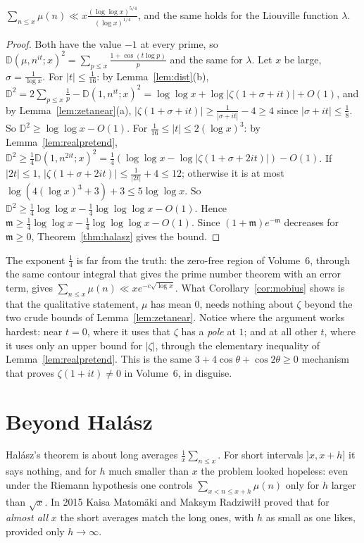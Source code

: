 \begin{corollary}\label{cor:mobius}
$\sum_{n\le x}\mu(n)\ll x\frac{(\log\log x)^{5/4}}{(\log x)^{1/4}}$, and the same holds for the Liouville function $\lambda$.
\end{corollary}
\begin{proof}
Both have the value $-1$ at every prime, so $\mathbb D(\mu,n^{it};x)^2=\sum_{p\le x}\frac{1+\cos(t\log p)}p$ and the same for $\lambda$. Let $x$ be large, $\sigma=\frac1{\log x}$.
For $|t|\le\frac1{16}$: by Lemma~\ref{lem:dist}(b), $\mathbb D^2=2\sum_{p\le x}\frac1p-\mathbb D(1,n^{it};x)^2=\log\log x+\log|\zeta(1+\sigma+it)|+O(1)$, and by Lemma~\ref{lem:zetanear}(a), $|\zeta(1+\sigma+it)|\ge\frac1{|\sigma+it|}-4\ge4$ since $|\sigma+it|\le\frac18$. So $\mathbb D^2\ge\log\log x-O(1)$.
For $\frac1{16}\le|t|\le2(\log x)^3$: by Lemma~\ref{lem:realpretend}, $\mathbb D^2\ge\frac14\mathbb D(1,n^{2it};x)^2=\frac14(\log\log x-\log|\zeta(1+\sigma+2it)|)-O(1)$. If $|2t|\le1$, $|\zeta(1+\sigma+2it)|\le\frac1{|2t|}+4\le12$; otherwise it is at most $\log(4(\log x)^3+3)+3\le5\log\log x$. So $\mathbb D^2\ge\frac14\log\log x-\frac14\log\log\log x-O(1)$.
Hence $\mathfrak m\ge\frac14\log\log x-\frac14\log\log\log x-O(1)$. Since $(1+\mathfrak m)e^{-\mathfrak m}$ decreases for $\mathfrak m\ge0$, Theorem~\ref{thm:halasz} gives the bound.
\end{proof}

The exponent $\frac14$ is far from the truth: the zero-free region of Volume~6, through the same contour integral that gives the prime number theorem with an error term, gives $\sum_{n\le x}\mu(n)\ll xe^{-c\sqrt{\log x}}$. What Corollary~\ref{cor:mobius} shows is that the qualitative statement, $\mu$ has mean $0$, needs nothing about $\zeta$ beyond the two crude bounds of Lemma~\ref{lem:zetanear}. Notice where the argument works hardest: near $t=0$, where it uses that $\zeta$ has a \emph{pole} at $1$; and at all other $t$, where it uses only an upper bound for $|\zeta|$, through the elementary inequality of Lemma~\ref{lem:realpretend}. This is the same $3+4\cos\theta+\cos2\theta\ge0$ mechanism that proves $\zeta(1+it)\ne0$ in Volume~6, in disguise.

\section{Beyond Halász}

Halász's theorem is about long averages $\frac1x\sum_{n\le x}$. For short intervals $]x,x+h]$ it says nothing, and for $h$ much smaller than $x$ the problem looked hopeless: even under the Riemann hypothesis one controls $\sum_{x<n\le x+h}\mu(n)$ only for $h$ larger than $\sqrt x$. In 2015 Kaisa Matomäki and Maksym Radziwiłł proved that for \emph{almost all} $x$ the short averages match the long ones, with $h$ as small as one likes, provided only $h\to\infty$.

